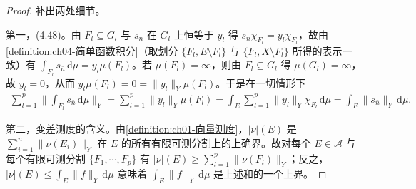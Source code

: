 \documentclass[../../main.tex]{subfiles}%
\begin{document}
\begin{proof}
补出两处细节。

第一，(4.48)。由 $F_l\subseteq G_l$ 与 $s_{\bar n}$ 在 $G_l$ 上恒等于 $y_l$ 得 $s_{\bar n}\chi_{F_l}=y_l\chi_{F_l}$，故由\cref{definition:ch04-简单函数积分}（取划分 $\{F_l,E\setminus F_l\}$ 与 $\{F_l,X\setminus F_l\}$ 所得的表示一致）有 $\int_{F_l}s_{\bar n}\,\mathrm{d}\mu=y_l\mu(F_l)$。若 $\mu(F_l)=\infty$，则由 $F_l\subseteq G_l$ 得 $\mu(G_l)=\infty$，故 $y_l=0$，从而 $y_l\mu(F_l)=0=\|y_l\|_Y\mu(F_l)$。于是在一切情形下
\begin{align*}
\sum_{l=1}^p\Big\|\int_{F_l}s_{\bar n}\,\mathrm{d}\mu\Big\|_Y=\sum_{l=1}^p\|y_l\|_Y\mu(F_l)=\int_E\sum_{l=1}^p\|y_l\|_Y\chi_{F_l}\,\mathrm{d}\mu=\int_E\|s_{\bar n}\|_Y\,\mathrm{d}\mu.
\end{align*}

第二，变差测度的含义。由\cref{definition:ch01-向量测度}，$|\nu|(E)$ 是 $\sum_{i=1}^n\|\nu(E_i)\|_Y$ 在 $E$ 的所有有限可测分割上的上确界。故对每个 $E\in\mathcal{A}$ 与每个有限可测分割 $\{F_1,\cdots ,F_p\}$ 有 $|\nu|(E)\geqslant\sum_{l=1}^p\|\nu(F_l)\|_Y$；反之，$|\nu|(E)\leqslant\int_E\|f\|_Y\,\mathrm{d}\mu$ 意味着 $\int_E\|f\|_Y\,\mathrm{d}\mu$ 是上述和的一个上界。
\end{proof}
\end{document}
